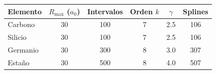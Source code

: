 \begin{tabular}{lccccc}
    \toprule
    \textbf{Elemento} & $R_{\text{max}}$ ($a_0$) & \textbf{Intervalos} & \textbf{Orden} $k$ & $\gamma$ & \textbf{Splines} \\
    \midrule
    Carbono & 30 & 100 & 7 & 2.5 & 106 \\
    Silicio & 30 & 100 & 7 & 2.5 & 106 \\
    Germanio & 30 & 300 & 8 & 3.0 & 307 \\
    Estaño & 30 & 500 & 8 & 4.0 & 507 \\
    \bottomrule
\end{tabular}
